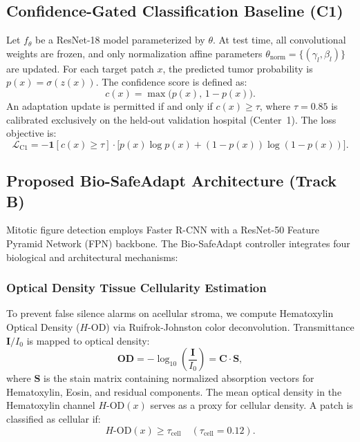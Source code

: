 \documentclass[conference]{IEEEtran}
\begin{document}
\subsection{Confidence-Gated Classification Baseline (C1)}
Let $f_\theta$ be a ResNet-18 model parameterized by $\theta$. At test time, all convolutional weights are frozen, and only normalization affine parameters $\theta_{\text{norm}} = \{(\gamma_l, \beta_l)\}$ are updated. For each target patch $x$, the predicted tumor probability is $p(x) = \sigma(z(x))$. The confidence score is defined as:
\begin{equation}
    c(x) = \max\bigl(p(x),\, 1 - p(x)\bigr).
\end{equation}
An adaptation update is permitted if and only if $c(x) \ge \tau$, where $\tau = 0.85$ is calibrated exclusively on the held-out validation hospital (Center~1). The loss objective is:
\begin{equation}
    \mathcal{L}_{\text{C1}} = - \mathbf{1}[c(x) \ge \tau] \cdot \bigl[ p(x)\log p(x) + (1-p(x))\log(1-p(x)) \bigr].
\end{equation}

\subsection{Proposed Bio-SafeAdapt Architecture (Track B)}
Mitotic figure detection employs Faster R-CNN with a ResNet-50 Feature Pyramid Network (FPN) backbone. The Bio-SafeAdapt controller integrates four biological and architectural mechanisms:

\subsubsection{Optical Density Tissue Cellularity Estimation}
To prevent false silence alarms on acellular stroma, we compute Hematoxylin Optical Density ($H\text{-OD}$) via Ruifrok-Johnston color deconvolution. Transmittance $\mathbf{I} / I_0$ is mapped to optical density:
\begin{equation}
    \mathbf{OD} = -\log_{10}\left(\frac{\mathbf{I}}{I_0}\right) = \mathbf{C} \cdot \mathbf{S},
\end{equation}
where $\mathbf{S}$ is the stain matrix containing normalized absorption vectors for Hematoxylin, Eosin, and residual components. The mean optical density in the Hematoxylin channel $H\text{-OD}(x)$ serves as a proxy for cellular density. A patch is classified as cellular if:
\begin{equation}
    H\text{-OD}(x) \ge \tau_{\text{cell}} \quad (\tau_{\text{cell}} = 0.12).
\end{equation}
\end{document}
